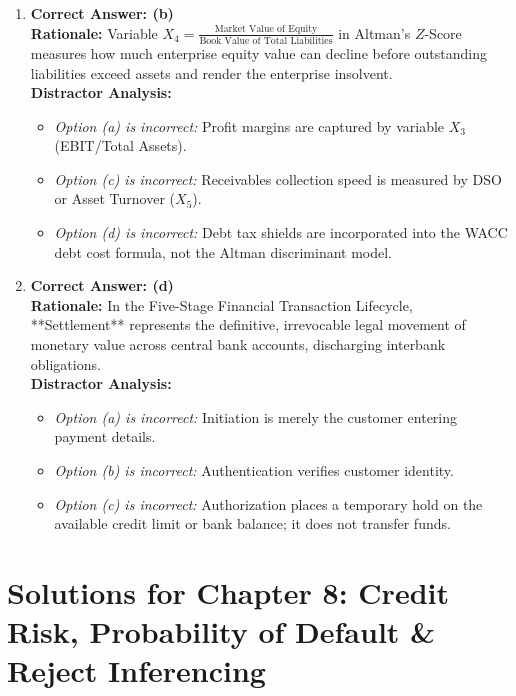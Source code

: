 \begin{enumerate}[label=\textbf{MCQ 7.\arabic*}]
    \item \textbf{Correct Answer: (b)}\\
    \textbf{Rationale:} Variable $X_4 = \frac{\text{Market Value of Equity}}{\text{Book Value of Total Liabilities}}$ in Altman's $Z$-Score measures how much enterprise equity value can decline before outstanding liabilities exceed assets and render the enterprise insolvent.\\
    \textbf{Distractor Analysis:}
    \begin{itemize}
        \item \textit{Option (a) is incorrect:} Profit margins are captured by variable $X_3$ (EBIT/Total Assets).
        \item \textit{Option (c) is incorrect:} Receivables collection speed is measured by DSO or Asset Turnover ($X_5$).
        \item \textit{Option (d) is incorrect:} Debt tax shields are incorporated into the WACC debt cost formula, not the Altman discriminant model.
    \end{itemize}

    \item \textbf{Correct Answer: (d)}\\
    \textbf{Rationale:} In the Five-Stage Financial Transaction Lifecycle, **Settlement** represents the definitive, irrevocable legal movement of monetary value across central bank accounts, discharging interbank obligations.\\
    \textbf{Distractor Analysis:}
    \begin{itemize}
        \item \textit{Option (a) is incorrect:} Initiation is merely the customer entering payment details.
        \item \textit{Option (b) is incorrect:} Authentication verifies customer identity.
        \item \textit{Option (c) is incorrect:} Authorization places a temporary hold on the available credit limit or bank balance; it does not transfer funds.
    \end{itemize}
\end{enumerate}

\newpage
\section*{Solutions for Chapter 8: Credit Risk, Probability of Default \& Reject Inferencing}

